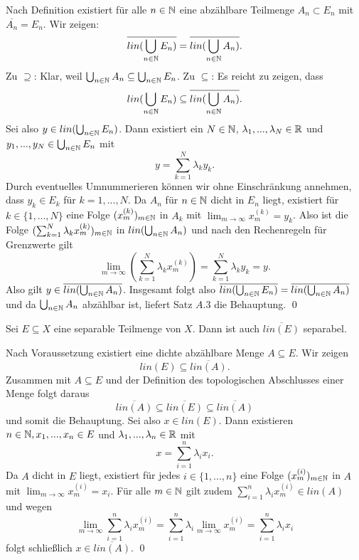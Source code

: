 \begin{proof*}
    Nach Definition existiert für alle $n \in \mathbb{N}$ eine abzählbare Teilmenge $A_n \subset E_n$ mit $\overline{A_n} = E_n$. Wir zeigen: 
    $$
    \overline{lin(\bigcup_{n \in \mathbb{N}}E_n)} = \overline{lin(\bigcup_{n \in \mathbb{N}}A_n)}. 
    $$
    Zu $\supseteq$: Klar, weil $\bigcup_{n \in \mathbb{N}}A_n \subseteq \bigcup_{n \in \mathbb{N}}E_n$. \newline 
    Zu $\subseteq$: Es reicht zu zeigen, dass
    $$
        lin(\bigcup_{n \in \mathbb{N}}E_n) \subseteq \overline{lin(\bigcup_{n \in \mathbb{N}}A_n)}.
    $$
    Sei also $y \in lin(\bigcup_{n \in \mathbb{N}}E_n)$. Dann existiert ein $N \in \mathbb{N}$, $\lambda_1,...,\lambda_N \in \mathbb{R}$ und $y_1,...,y_N \in \bigcup_{n \in \mathbb{N}}E_n$ mit 
    $$
        y = \sum_{k=1}^N\lambda_ky_k. 
    $$
    Durch eventuelles Umnummerieren können wir ohne Einschränkung annehmen, dass $y_k \in E_k$ für $k=1,...,N$. 
    Da $A_n$ für $n \in \mathbb{N}$ dicht in $E_n$ liegt, existiert für $k \in \{1,...,N\}$ eine Folge $(x_m^{(k)})_{m \in \mathbb{N}}$ in $A_k$ mit $\lim_{m \to \infty}x_m^{(k)} = y_k$. 
    Also ist die Folge $(\sum_{k=1}^N\lambda_k x_m^{(k)})_{m \in \mathbb{N}}$ in $lin(\bigcup_{n \in \mathbb{N}}A_n)$ und nach den Rechenregeln für Grenzwerte gilt 
    $$
        \lim_{m \to \infty}(\sum_{k=1}^N\lambda_k x_m^{(k)}) = \sum_{k=1}^N\lambda_ky_k = y. 
    $$
    Also gilt $y \in \overline{lin(\bigcup_{n \in \mathbb{N}}A_n)}$. 
    Insgesamt folgt also $\overline{lin(\bigcup_{n \in \mathbb{N}}E_n)} = \overline{lin(\bigcup_{n \in \mathbb{N}}A_n)}$ und da $\bigcup_{n \in \mathbb{N}}A_n$ abzählbar ist, liefert Satz $A.3$ die Behauptung. \qed
\end{proof*}

\begin{corollary}
    Sei $E \subseteq X$ eine separable Teilmenge von $X$. Dann ist auch $\overline{lin(E)}$ separabel. 
\end{corollary}
\begin{proof*}
    Nach Voraussetzung existiert eine dichte abzählbare Menge $A \subseteq E$. Wir zeigen 
    $$
        lin(E) \subseteq \overline{lin(A)}. 
    $$
    Zusammen mit $A \subseteq E$ und der Definition des topologischen Abschlusses einer Menge folgt daraus
    $$
        \overline{lin(A)} \subseteq \overline{lin(E)} \subseteq \overline{lin(A)}
    $$
    und somit die Behauptung. Sei also $x \in lin(E)$. Dann existieren $n \in \mathbb{N}, x_1,...,x_n \in E$ und $\lambda_1,...,\lambda_n \in \mathbb{R}$ mit
    $$
        x = \sum_{i=1}^n \lambda_i x_i. 
    $$ 
    Da $A$ dicht in $E$ liegt, existiert für jedes $i \in \{1,...,n\}$ eine Folge $(x_m^{(i)})_{m \in \mathbb{N}}$ in $A$ mit $\lim_{m \to \infty}x_m^{(i)} = x_i$. 
    Für alle $m \in \mathbb{N}$ gilt zudem $\sum_{i=1}^n \lambda_i x_m^{(i)} \in lin(A)$ und wegen 
    $$
        \lim_{m \to \infty} \sum_{i=1}^n \lambda_i x_m^{(i)} = \sum_{i=1}^n \lambda_i \lim_{m \to \infty}x_m^{(i)} = \sum_{i=1}^n \lambda_i x_i
    $$
    folgt schließlich $x \in \overline{lin(A)}$. \qed 
\end{proof*}

